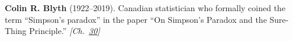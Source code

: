 \textbf{Colin R. Blyth} (1922–2019). Canadian statistician who formally coined the term ``Simpson's paradox'' in the paper ``On Simpson's Paradox and the Sure-Thing Principle.'' \emph{[Ch.~\hyperref[ch:simpsonsparadox]{30}]}

